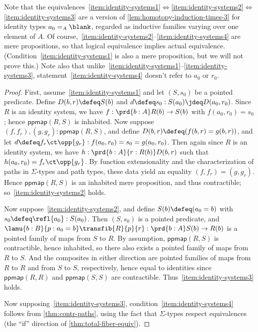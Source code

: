 Note that the equivalences~\ref{item:identity-systems1}$\Leftrightarrow$\ref{item:identity-systems2}$\Leftrightarrow$\ref{item:identity-systems3} are a version of \cref{lem:homotopy-induction-times-3} for identity types $a_0 =_A \blank$, regarded as inductive families varying over one element of $A$.
Of course,~\ref{item:identity-systems2}--\ref{item:identity-systems4} are mere propositions, so that logical equivalence implies actual equivalence.
(Condition~\ref{item:identity-systems1} is also a mere proposition, but we will not prove this.)
Note also that unlike~\ref{item:identity-systems1}--\ref{item:identity-systems3}, statement~\ref{item:identity-systems4} doesn't refer to $a_0$ or $r_0$.

\begin{proof}
  First, assume~\ref{item:identity-systems1} and let $(S,s_0)$ be a pointed predicate.
  Define $D(b,r) \defeq S(b)$ and $d\defeq s_0: S(a_0) \jdeq D(a_0,r_0)$.
  Since $R$ is an identity system, we have $f:\prd{b:A} R(b) \to S(b)$ with $f(a_0,r_0) = s_0$; hence $\mathsf{ppmap}(R,S)$ is inhabited.
  Now suppose $(f,f_r),(g,g_r) : \mathsf{ppmap}(R,S)$, and define $D(b,r) \defeq (f(b,r) = g(b,r))$, and let $d \defeq f_r \ct \opp{g_r} : f(a_0,r_0) = s_0 = g(a_0,r_0)$.
  Then again since $R$ is an identity system, we have $h:\prd{b:A}{r:R(b)} D(b,r)$ such that $h(a_0,r_0) = f_r \ct \opp{g_r}$.
  By function extensionality and the characterization of paths in $\Sigma$-types and path types, these data yield an equality $(f,f_r) = (g,g_r)$.
  Hence $\mathsf{ppmap}(R,S)$ is an inhabited mere proposition, and thus contractible; so~\ref{item:identity-systems2} holds.

  Now suppose~\ref{item:identity-systems2}, and define $S(b) \defeq (a_0=b)$ with $s_0 \defeq \refl{a_0}:S(a_0)$.
  Then $(S,s_0)$ is a pointed predicate, and $\lamu{b:B}{p:a_0=b} \transfib{R}{p}{r} : \prd{b:A} S(b) \to R(b)$ is a pointed family of maps from $S$ to $R$.
  By assumption, $\mathsf{ppmap}(R,S)$ is contractible, hence inhabited, so there also exists a pointed family of maps from $R$ to $S$.
  And the composites in either direction are pointed families of maps from $R$ to $R$ and from $S$ to $S$, respectively, hence equal to identities since $\mathsf{ppmap}(R,R)$ and $\mathsf{ppmap}(S,S)$ are contractible.
  Thus~\ref{item:identity-systems3} holds.

  Now supposing~\ref{item:identity-systems3}, condition~\ref{item:identity-systems4} follows from \cref{thm:contr-paths}, using the fact that $\Sigma$-types respect equivalences (the ``if'' direction of \cref{thm:total-fiber-equiv}).


\end{proof}
